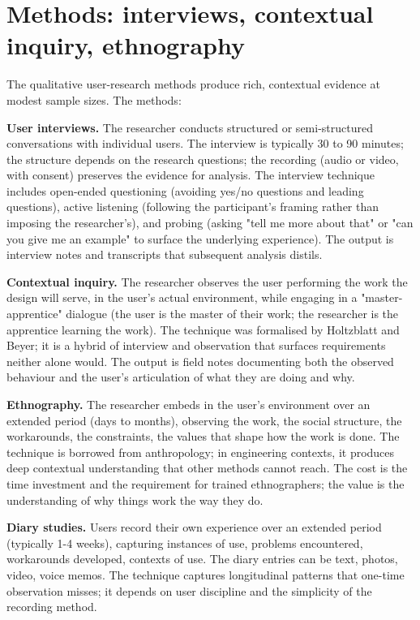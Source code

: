 \section{Methods: interviews, contextual inquiry, ethnography}

The qualitative user-research methods produce rich, contextual evidence at modest sample sizes. The methods:

\textbf{User interviews.} The researcher conducts structured or semi-structured conversations with individual users. The interview is typically 30 to 90 minutes; the structure depends on the research questions; the recording (audio or video, with consent) preserves the evidence for analysis. The interview technique includes open-ended questioning (avoiding yes/no questions and leading questions), active listening (following the participant's framing rather than imposing the researcher's), and probing (asking "tell me more about that" or "can you give me an example" to surface the underlying experience). The output is interview notes and transcripts that subsequent analysis distils.

\textbf{Contextual inquiry.} The researcher observes the user performing the work the design will serve, in the user's actual environment, while engaging in a "master-apprentice" dialogue (the user is the master of their work; the researcher is the apprentice learning the work). The technique was formalised by Holtzblatt and Beyer; it is a hybrid of interview and observation that surfaces requirements neither alone would. The output is field notes documenting both the observed behaviour and the user's articulation of what they are doing and why.

\textbf{Ethnography.} The researcher embeds in the user's environment over an extended period (days to months), observing the work, the social structure, the workarounds, the constraints, the values that shape how the work is done. The technique is borrowed from anthropology; in engineering contexts, it produces deep contextual understanding that other methods cannot reach. The cost is the time investment and the requirement for trained ethnographers; the value is the understanding of why things work the way they do.

\textbf{Diary studies.} Users record their own experience over an extended period (typically 1-4 weeks), capturing instances of use, problems encountered, workarounds developed, contexts of use. The diary entries can be text, photos, video, voice memos. The technique captures longitudinal patterns that one-time observation misses; it depends on user discipline and the simplicity of the recording method.

